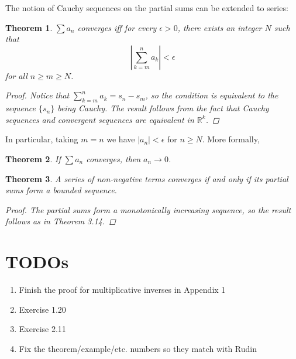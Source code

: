 \documentclass{scrbook}
\newcommand{\R}{\mathbb{R}}
\renewcommand{\to}{\rightarrow}
\newtheorem{theorem}{Theorem}
\begin{document}
The notion of Cauchy sequences on the partial sums can be extended to series:
\begin{theorem} %
$\sum a_n$ converges iff for every $\epsilon > 0$, there exists an integer $N$ such that
\[
	\left| \sum_{k=m}^{n} a_k \right| < \epsilon
\]
for all $n \ge m \ge N$. 

\begin{proof}
Notice that $\sum_{k=m}^{n} a_k = s_n - s_m$, so the condition is equivalent to the sequence $\{s_n\}$ being Cauchy. The result follows from the fact that Cauchy sequences and convergent sequences are equivalent in $\R^k$.
\end{proof}
\end{theorem}

In particular, taking $m = n$ we have $|a_n| < \epsilon$ for $n \ge N$. More formally,

\begin{theorem} %
If $\sum a_n$ converges, then $a_n \to 0$.
\end{theorem}

\begin{theorem} %
A series of non-negative terms converges if and only if its partial sums form a bounded sequence.

\begin{proof}
The partial sums form a monotonically increasing sequence, so the result follows as in Theorem 3.14.
\end{proof}
\end{theorem}

\chapter{TODOs}

\begin{enumerate}
\item Finish the proof for multiplicative inverses in Appendix 1
\item Exercise 1.20
\item Exercise 2.11
\item Fix the theorem/example/etc. numbers so they match with Rudin
\end{enumerate}
\end{document}
